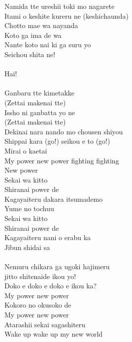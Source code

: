 \begin{multicols}{2}

Namida tte ureshii toki mo nagarete\\
Itami o keshite kureru ne (keshichaunda)\\
Chotto mae wa nayanda\\
Koto ga ima de wa\\
Nante koto nai ki ga suru yo\\
Seichou shita ne!\\

\\
Hai!\\
\\

Ganbaru tte kimetakke\\
(Zettai makenai tte)\\
Issho ni ganbatta yo ne\\
(Zettai makenai tte)\\
Dekinai nara nando mo chousen shiyou\\
Shippai kara (go!) seikou e to (go!)\\
Mirai o kaetai\\

My power new power fighting fighting\\
New power \\

Sekai wa kitto \\
Shiranai power de \\
Kagayaiteru dakara itsumademo\\
Yume no tochuu\\
Sekai wa kitto \\
Shiranai power de \\
Kagayaiteru nani o erabu ka \\
Jibun shidai sa\\
\\
Nemuru chikara ga ugoki hajimeru\\
 jitto shitenaide ikou yo!\\
Doko e doko e doko e ikou ka?\\

My power new power\\
Kokoro no okusoko de\\
My power new power\\
Atarashii sekai sagashiteru\\
Wake up wake up my new world
\end{multicols}

\ifdefined\COMPLETE
\else
	
\fi
